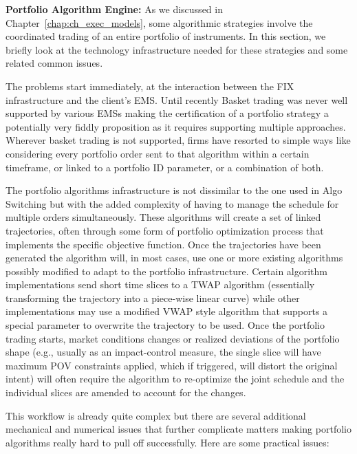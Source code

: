 \noindent\textbf{Portfolio Algorithm Engine:} As we discussed in Chapter~\ref{chap:ch_exec_models}, some algorithmic strategies involve the coordinated trading of an entire portfolio of instruments. In this section, we briefly look at the technology infrastructure needed for these strategies and some related common issues. 


The problems start immediately, at the interaction between the FIX infrastructure and the client's EMS. Until recently Basket trading was never well supported by various EMSs making the certification of a portfolio strategy a potentially very fiddly proposition as it requires supporting multiple approaches. Wherever basket trading is not supported, firms have resorted to simple ways like considering every portfolio order sent to that algorithm within a certain timeframe, or linked to a portfolio ID parameter, or a combination of both.


The portfolio algorithms infrastructure is not dissimilar to the one used in Algo Switching but with the added complexity of having to manage the schedule for multiple orders simultaneously. These algorithms will create a set of linked trajectories, often through some form of portfolio optimization process that implements the specific objective function. Once the trajectories have been generated the algorithm will, in most cases, use one or more existing algorithms possibly modified to adapt to the portfolio infrastructure. Certain algorithm implementations send short time slices to a TWAP algorithm (essentially transforming the trajectory into a piece-wise linear curve) while other implementations may use a modified VWAP style algorithm that supports a special parameter to overwrite the trajectory to be used. Once the portfolio trading starts, market conditions changes or realized deviations of the portfolio shape (e.g., usually as an impact-control measure, the single slice will have maximum POV constraints applied, which if triggered, will distort the original intent) will often require the algorithm to re-optimize the joint schedule and the individual slices are amended to account for the changes.


This workflow is already quite complex but there are several additional mechanical and numerical issues that further complicate matters making portfolio algorithms really hard to pull off successfully. Here are some practical issues:

